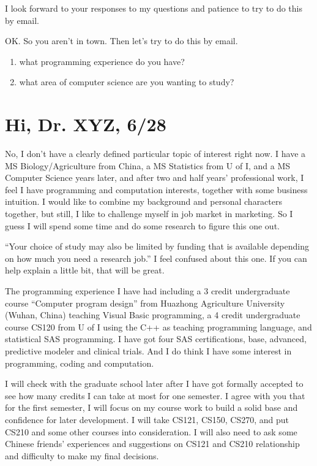 \documentclass[12pt]{book}
\begin{document}
I look forward to your responses to my questions and patience to try to do this by email.

OK.   So you aren't in town.
Then let's try to do this by email.
\begin{enumerate}
\item what programming experience do you have?
\item what area of computer science are you wanting to study?
\end{enumerate}


\section{Hi, Dr. XYZ,  6/28}
\label{sec-2-3}

No, I don’t have a clearly defined particular topic of interest right now. I have a MS Biology/Agriculture from China, a MS Statistics from U of I, and a MS Computer Science years later, and after two and half years’ professional work, I feel I have programming and computation interests, together with some business intuition. I would like to combine my background and personal characters together, but still, I like to challenge myself in job market in marketing. So I guess I will spend some time and do some research to figure this one out.

“Your choice of study may also be limited by funding that is available depending on how much you need a research job.” I feel confused about this one. If you can help explain a little bit, that will be great.

The programming experience I have had including a 3 credit undergraduate course “Computer program design” from Huazhong Agriculture University (Wuhan, China) teaching Visual Basic programming, a 4 credit undergraduate course CS120 from U of I using the C++ as teaching programming language, and statistical SAS programming. I have got four SAS certifications, base, advanced, predictive modeler and clinical trials. And I do think I have some interest in programming, coding and computation.

I will check with the graduate school later after I have got formally accepted to see how many credits I can take at most for one semester. I agree with you that for the first semester, I will focus on my course work to build a solid base and confidence for later development. I will take CS121, CS150, CS270, and put CS210 and some other courses into consideration. I will also need to ask some Chinese friends’ experiences and suggestions on CS121 and CS210 relationship and difficulty to make my final decisions.
\end{document}
